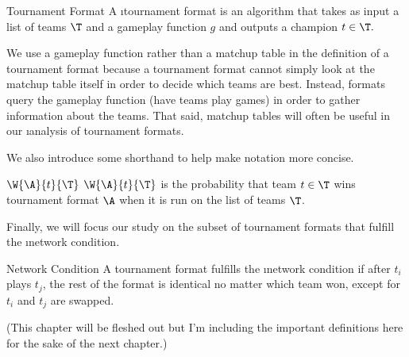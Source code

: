 {

\begin{definition}{Tournament Format}{}
    A \i{tournament format} is an algorithm that takes as input a list of teams $\T$ and a gameplay function $g$ and outputs a champion $t \in \T.$
\end{definition}

We use a gameplay function rather than a matchup table in the definition of a tournament format because a tournament format cannot simply look at the matchup table itself in order to decide which teams are best. Instead, formats query the gameplay function (have teams play games) in order to gather information about the teams. That said, matchup tables will often be useful in our \i{analysis} of tournament formats. 

We also introduce some shorthand to help make notation more concise.

\begin{definition}{$\W{\A}{t}{\T}$}{}
    $\W{\A}{t}{\T}$ is the probability that team $t \in \T$ wins tournament format $\A$ when it is run on the list of teams $\T$.
\end{definition}



Finally, we will focus our study on the subset of tournament formats that fulfill the \i{network condition}.

\begin{definition}{Network Condition}{}
    A tournament format fulfills the \i{network condition} if after $t_i$ plays $t_j$, the rest of the format is identical no matter which team won, except for $t_i$ and $t_j$ are swapped.
\end{definition}

(This chapter will be fleshed out but I'm including the important definitions here for the sake of the next chapter.)
}







